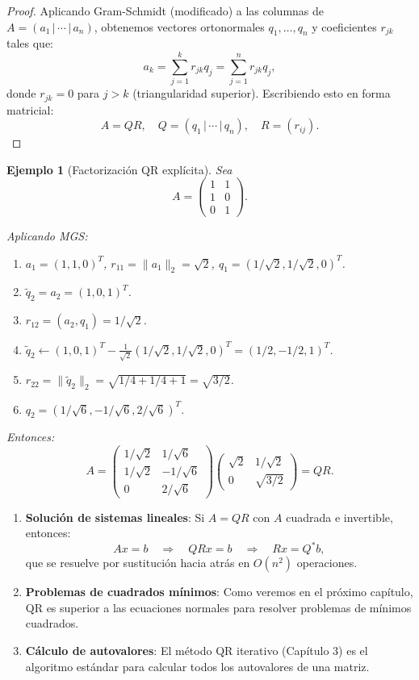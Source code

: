 \documentclass[a4paper,11pt]{report}
\newtheorem{example}[theorem]{Ejemplo}
\begin{document}
\begin{proof}
Aplicando Gram-Schmidt (modificado) a las columnas de $A = (a_1 \, | \, \cdots \, | \, a_n)$, obtenemos vectores ortonormales $q_1, \ldots, q_n$ y coeficientes $r_{jk}$ tales que:
\[
a_k = \sum_{j=1}^{k} r_{jk} q_j = \sum_{j=1}^{n} r_{jk} q_j,
\]
donde $r_{jk} = 0$ para $j > k$ (triangularidad superior). Escribiendo esto en forma matricial:
\[
A = QR, \quad Q = (q_1 \, | \, \cdots \, | \, q_n), \quad R = (r_{ij}).
\]
\end{proof}

\begin{example}[Factorización QR explícita]
Sea 
\[
A = \begin{pmatrix}
1 & 1 \\
1 & 0 \\
0 & 1
\end{pmatrix}.
\]

Aplicando MGS:
\begin{enumerate}
\item $a_1 = (1, 1, 0)^T$, $r_{11} = \|a_1\|_2 = \sqrt{2}$, $q_1 = (1/\sqrt{2}, 1/\sqrt{2}, 0)^T$.
\item $\tilde{q}_2 = a_2 = (1, 0, 1)^T$.
\item $r_{12} = (a_2, q_1) = 1/\sqrt{2}$.
\item $\tilde{q}_2 \leftarrow (1, 0, 1)^T - \frac{1}{\sqrt{2}} (1/\sqrt{2}, 1/\sqrt{2}, 0)^T = (1/2, -1/2, 1)^T$.
\item $r_{22} = \|\tilde{q}_2\|_2 = \sqrt{1/4 + 1/4 + 1} = \sqrt{3/2}$.
\item $q_2 = (1/\sqrt{6}, -1/\sqrt{6}, 2/\sqrt{6})^T$.
\end{enumerate}

Entonces:
\[
A = \begin{pmatrix}
1/\sqrt{2} & 1/\sqrt{6} \\
1/\sqrt{2} & -1/\sqrt{6} \\
0 & 2/\sqrt{6}
\end{pmatrix}
\begin{pmatrix}
\sqrt{2} & 1/\sqrt{2} \\
0 & \sqrt{3/2}
\end{pmatrix}
= QR.
\]
\end{example}

\begin{enumerate}
\item \textbf{Solución de sistemas lineales}: Si $A = QR$ con $A$ cuadrada e invertible, entonces:
\[
Ax = b \quad \Rightarrow \quad QRx = b \quad \Rightarrow \quad Rx = Q^*b,
\]
que se resuelve por sustitución hacia atrás en $O(n^2)$ operaciones.

\item \textbf{Problemas de cuadrados mínimos}: Como veremos en el próximo capítulo, QR es superior a las ecuaciones normales para resolver problemas de mínimos cuadrados.

\item \textbf{Cálculo de autovalores}: El método QR iterativo (Capítulo 3) es el algoritmo estándar para calcular todos los autovalores de una matriz.
\end{enumerate}
\end{document}
